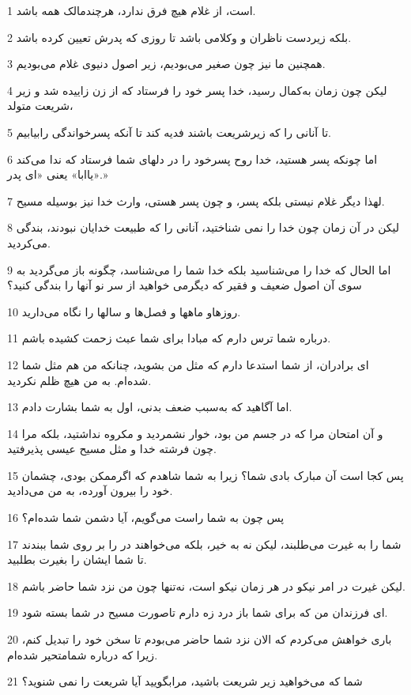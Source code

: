 \par 1 است، از غلام هیچ فرق ندارد، هرچندمالک همه باشد.
\par 2 بلکه زیردست ناظران و وکلامی باشد تا روزی که پدرش تعیین کرده باشد.
\par 3 همچنین ما نیز چون صغیر می‌بودیم، زیر اصول دنیوی غلام می‌بودیم.
\par 4 لیکن چون زمان به‌کمال رسید، خدا پسر خود را فرستاد که از زن زاییده شد و زیر شریعت متولد،
\par 5 تا آنانی را که زیرشریعت باشند فدیه کند تا آنکه پسرخواندگی رابیابیم.
\par 6 اما چونکه پسر هستید، خدا روح پسرخود را در دلهای شما فرستاد که ندا می‌کند «یاابا» یعنی «ای پدر.»
\par 7 لهذا دیگر غلام نیستی بلکه پسر، و چون پسر هستی، وارث خدا نیز بوسیله مسیح.
\par 8 لیکن در آن زمان چون خدا را نمی شناختید، آنانی را که طبیعت خدایان نبودند، بندگی می‌کردید.
\par 9 اما الحال که خدا را می‌شناسید بلکه خدا شما را می‌شناسد، چگونه باز می‌گردید به سوی آن اصول ضعیف و فقیر که دیگرمی خواهید از سر نو آنها را بندگی کنید؟
\par 10 روزهاو ماهها و فصل‌ها و سالها را نگاه می‌دارید.
\par 11 درباره شما ترس دارم که مبادا برای شما عبث زحمت کشیده باشم.
\par 12 ‌ای برادران، از شما استدعا دارم که مثل من بشوید، چنانکه من هم مثل شما شده‌ام. به من هیچ ظلم نکردید.
\par 13 اما آگاهید که به‌سبب ضعف بدنی، اول به شما بشارت دادم.
\par 14 و آن امتحان مرا که در جسم من بود، خوار نشمردید و مکروه نداشتید، بلکه مرا چون فرشته خدا و مثل مسیح عیسی پذیرفتید.
\par 15 پس کجا است آن مبارک بادی شما؟ زیرا به شما شاهدم که اگرممکن بودی، چشمان خود را بیرون آورده، به من می‌دادید.
\par 16 پس چون به شما راست می‌گویم، آیا دشمن شما شده‌ام؟
\par 17 شما را به غیرت می‌طلبند، لیکن نه به خیر، بلکه می‌خواهند در را بر روی شما ببندند تا شما ایشان را بغیرت بطلبید.
\par 18 لیکن غیرت در امر نیکو در هر زمان نیکو است، نه‌تنها چون من نزد شما حاضر باشم.
\par 19 ‌ای فرزندان من که برای شما باز درد زه دارم تاصورت مسیح در شما بسته شود.
\par 20 باری خواهش می‌کردم که الان نزد شما حاضر می‌بودم تا سخن خود را تبدیل کنم، زیرا که درباره شمامتحیر شده‌ام.
\par 21 شما که می‌خواهید زیر شریعت باشید، مرابگویید آیا شریعت را نمی شنوید؟
